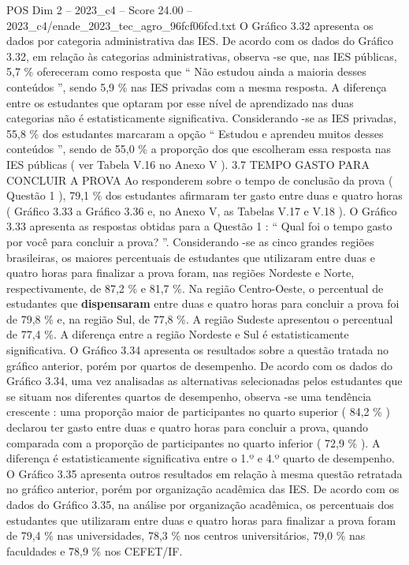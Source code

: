 \begin{textsample}{POS Dim 2 – 2023\_c4 – Score 24.00 – 2023\_c4/enade\_2023\_tec\_agro\_96fcf06fcd.txt}
O Gráfico 3.32 apresenta os dados por categoria administrativa das IES.
De acordo com os dados do Gráfico 3.32, em relação às categorias administrativas, observa -se que, nas IES públicas, 5,7 \% ofereceram como resposta que “ Não estudou ainda a maioria desses conteúdos ”, sendo 5,9 \% nas IES privadas com a mesma resposta.
A diferença entre os estudantes que optaram por esse nível de aprendizado nas duas categorias não é estatisticamente significativa.
Considerando -se as IES privadas, 55,8 \% dos estudantes marcaram a opção “ Estudou e aprendeu muitos desses conteúdos ”, sendo de 55,0 \% a proporção dos que escolheram essa resposta nas IES públicas ( ver Tabela V.16 no Anexo V ). 3.7 TEMPO GASTO PARA CONCLUIR A PROVA Ao responderem sobre o tempo de conclusão da prova ( Questão 1 ), 79,1 \% dos estudantes afirmaram ter gasto entre duas e quatro horas ( Gráfico 3.33 a Gráfico 3.36 e, no Anexo V, as Tabelas V.17 e V.18 ).
O Gráfico 3.33 apresenta as respostas obtidas para a Questão 1 : “ Qual foi o tempo gasto por você para concluir a prova? ”.
Considerando -se as cinco grandes regiões brasileiras, os maiores percentuais de estudantes que utilizaram entre duas e quatro horas para finalizar a prova foram, nas regiões Nordeste e Norte, respectivamente, de 87,2 \% e 81,7 \%.
Na região Centro-Oeste, o percentual de estudantes que \textbf{dispensaram} entre duas e quatro horas para concluir a prova foi de 79,8 \% e, na região Sul, de 77,8 \%.
A região Sudeste apresentou o percentual de 77,4 \%.
A diferença entre a região Nordeste e Sul é estatisticamente significativa.
O Gráfico 3.34 apresenta os resultados sobre a questão tratada no gráfico anterior, porém por quartos de desempenho.
De acordo com os dados do Gráfico 3.34, uma vez analisadas as alternativas selecionadas pelos estudantes que se situam nos diferentes quartos de desempenho, observa -se uma tendência crescente : uma proporção maior de participantes no quarto superior ( 84,2 \% ) declarou ter gasto entre duas e quatro horas para concluir a prova, quando comparada com a proporção de participantes no quarto inferior ( 72,9 \% ).
A diferença é estatisticamente significativa entre o 1.º e 4.º quarto de desempenho.
O Gráfico 3.35 apresenta outros resultados em relação à mesma questão retratada no gráfico anterior, porém por organização acadêmica das IES.
De acordo com os dados do Gráfico 3.35, na análise por organização acadêmica, os percentuais dos estudantes que utilizaram entre duas e quatro horas para finalizar a prova foram de 79,4 \% nas universidades, 78,3 \% nos centros universitários, 79,0 \% nas faculdades e 78,9 \% nos CEFET/IF.

\end{textsample}
